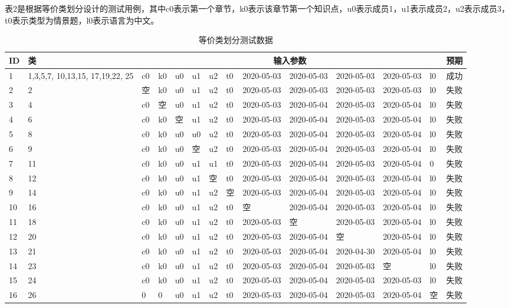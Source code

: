 \documentclass[hyperref, a4paper]{ctexart}
\begin{document}
表2是根据等价类划分设计的测试用例，其中c0表示第一个章节，k0表示该章节第一个知识点，u0表示成员1，u1表示成员2，u2表示成员3，t0表示类型为情景题，l0表示语言为中文。

\begin{table}[!htbp]
  \caption{等价类划分测试数据}
  \centering
  \begin{tabular}{|p{0.35cm}|p{1.2cm}|p{0.22cm}|p{0.22cm}|p{0.22cm}|p{0.22cm}|p{0.22cm}|p{0.22cm}|p{0.9cm}|p{0.9cm}|p{0.9cm}|p{0.9cm}|p{0.22cm}|p{0.8cm}|}
  \hline
  \textbf{ID} & \textbf{类} & \multicolumn{11}{c|}{\textbf{输入参数}} & \textbf{预期}  \\ 
  \hline
1   & 1,3,5,7, 10,13,15, 17,19,22, 25 & c0  & k0 & u0 & u1 & u2 & t0  & 2020-05-03 & 2020-05-03 & 2020-05-03 & 2020-05-03 & l0 & 成功   \\
  \hline
2   & 2  & 空 & k0  & u0 & u1 & u2 & t0  & 2020-05-03 & 2020-05-03  
& 2020-05-03 & 2020-05-03 & l0 & 失败   \\
  \hline
3   & 4  & c0 & 空 & u0 & u1 & u2 & t0  & 2020-05-03 & 2020-05-04  
& 2020-05-03 & 2020-05-04 & l0 & 失败   \\
  \hline
4   & 6  & c0 & k0  & 空 & u1 & u2 & t0  & 2020-05-03 & 2020-05-04  
& 2020-05-03 & 2020-05-04 & l0 & 失败   \\
  \hline
5   & 8  & c0 & k0  & u0 & u0 & u2 & t0  & 2020-05-03 & 2020-05-04  
& 2020-05-03 & 2020-05-04 & l0 & 失败   \\
  \hline
6   & 9  & c0 & k0  & u0 & 空 & u2 & t0  & 2020-05-03 & 2020-05-04  
& 2020-05-03 & 2020-05-04 & l0 & 失败   \\
  \hline
7   & 11 & c0 & k0  & u0 & u1 & u1 & t0  & 2020-05-03 & 2020-05-04  
& 2020-05-03 & 2020-05-04 & 0  & 失败   \\
  \hline
8   & 12 & c0 & k0  & u0 & u1 & 空 & t0  & 2020-05-03 & 2020-05-04  
& 2020-05-03 & 2020-05-04 & l0 & 失败   \\
  \hline
9   & 14 & c0 & k0  & u0 & u1 & u2 & 空  & 2020-05-03 & 2020-05-04  
& 2020-05-03 & 2020-05-04 & l0 & 失败   \\
  \hline 
10  & 16 & c0 & k0  & u0 & u1 & u2 & t0  & 空         & 2020-05-04  
& 2020-05-03 & 2020-05-04 & l0 & 失败   \\
  \hline
11  & 18 & c0 & k0  & u0 & u1 & u2 & t0  & 2020-05-03 & 空  
& 2020-05-03 & 2020-05-04 & l0 & 失败   \\
  \hline
12  & 20 & c0 & k0  & u0 & u1 & u2 & t0  & 2020-05-03 & 2020-05-04  
& 空         & 2020-05-04 & l0 & 失败   \\
  \hline
13  & 21 & c0 & k0  & u0 & u1 & u2 & t0  & 2020-05-03 & 2020-05-04  
& 2020-04-30 & 2020-05-04 & l0 & 失败   \\
  \hline
14  & 23 & c0 & k0  & u0 & u1 & u2 & t0  & 2020-05-03 & 2020-05-04  
& 2020-05-03 & 空         & l0 & 失败   \\
  \hline
15  & 24 & c0 & k0  & u0 & u1 & u2 & t0  & 2020-05-03 & 2020-05-04  
& 2020-05-03 & 2020-05-03 & l0 & 失败   \\
  \hline
16  & 26 & 0  & 0  & u0 & u1 & u2 & t0  & 2020-05-03 & 2020-05-04  
& 2020-05-03 & 2020-05-04 & 空 & 失败   \\


\end{tabular}
\end{table}
\end{document}
